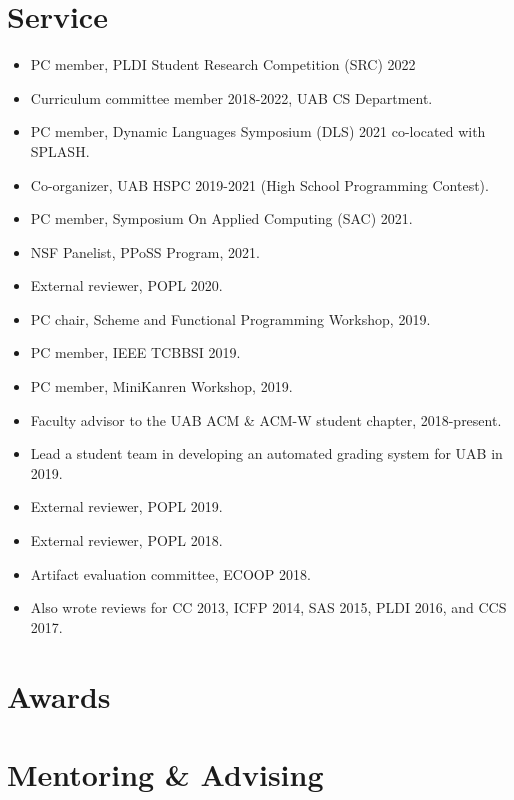 \documentclass[line]{res}
\begin{document}
\begin{resume}
\section{\large Service} \vspace{0.15in}
\begin{itemize}
    \item PC member, PLDI Student Research Competition (SRC) 2022
    \item Curriculum committee member 2018-2022, UAB CS Department.
    \item PC member, Dynamic Languages Symposium (DLS) 2021 co-located with SPLASH.
    \item Co-organizer, UAB HSPC 2019-2021 (High School Programming Contest).
    \item PC member, Symposium On Applied Computing (SAC) 2021.
    \item NSF Panelist, PPoSS Program, 2021.
    \item External reviewer, POPL 2020.
    \item PC chair, Scheme and Functional Programming Workshop, 2019.
    \item PC member, IEEE TCBBSI 2019.
    \item PC member, MiniKanren Workshop, 2019.
    \item Faculty advisor to the UAB ACM \& ACM-W student chapter, 2018-present.
    \item Lead a student team in developing an automated grading system for UAB in 2019.
    \item External reviewer, POPL 2019. 
    \item External reviewer, POPL 2018. 
    \item Artifact evaluation committee, ECOOP 2018.
    \item Also wrote reviews for CC 2013, ICFP 2014, SAS 2015, PLDI 2016, and CCS 2017.
\end{itemize}

\section{\large Awards} \vspace{0.15in}


\section{\large Mentoring \& Advising}




\end{resume}
\end{document}
